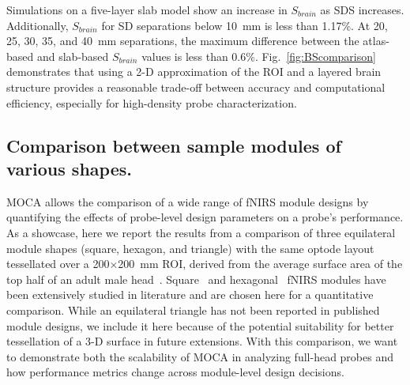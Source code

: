 Simulations on a five-layer slab model show an increase in $S_{brain}$ as \ac{SDS} increases. Additionally, $S_{brain}$ for \ac{SD} separations below 10~mm is less than 1.17\%. At 20, 25, 30, 35, and 40~mm separations, the maximum difference between the atlas-based and slab-based $S_{brain}$ values is less than 0.6\%. Fig.~\ref{fig:BScomparison} demonstrates that using a 2-D approximation of the \ac{ROI} and a layered brain structure provides a reasonable trade-off between accuracy and computational efficiency, especially for high-density probe characterization.

\subsection{Comparison between sample modules of various shapes.}
\label{subsec:comparison}
\ac{MOCA} allows the comparison of a wide range of \ac{fNIRS} module designs by quantifying the effects of probe-level design parameters on a probe's performance. As a showcase, here we report the results from a comparison of three equilateral module shapes (square, hexagon, and triangle) with the same optode layout tessellated over a 200$\times$200~mm \ac{ROI}, derived from the average surface area of the top half of an adult male head~\cite{McConville1980}. Square~\cite{Chitnis2016, Bci2017, Zimmermann2013} and hexagonal~\cite{Funane2017, Wyser2017, Zhao2019} \ac{fNIRS} modules have been extensively studied in literature and are chosen here for a quantitative comparison. While an equilateral triangle has not been reported in published module designs, we include it here because of the potential suitability for better tessellation of a 3-D surface in future extensions. With this comparison, we want to demonstrate both the scalability of \ac{MOCA} in analyzing full-head probes and how performance metrics change across module-level design decisions.

